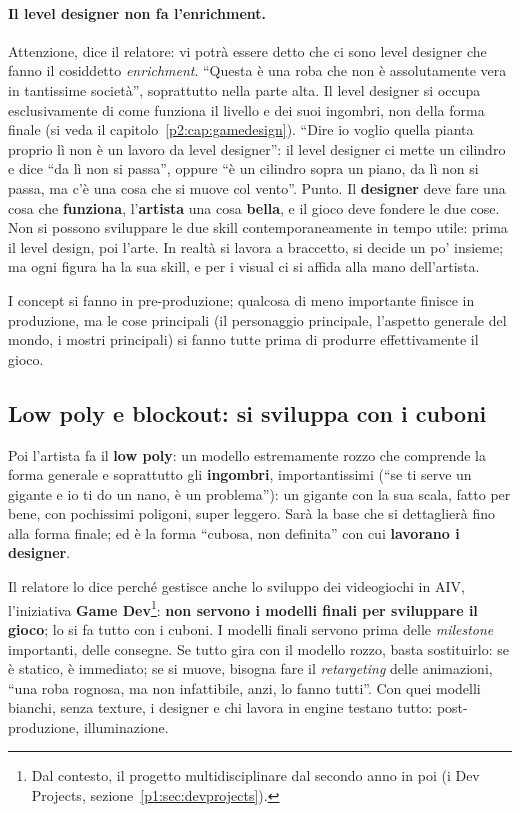 \paragraph{Il level designer non fa l'enrichment.} Attenzione, dice il
relatore: vi potrà essere detto che ci sono level designer che fanno il
cosiddetto \emph{enrichment}. ``Questa è una roba che non è assolutamente vera
in tantissime società'', soprattutto nella parte alta. Il level designer si
occupa esclusivamente di come funziona il livello e dei suoi ingombri, non della
forma finale (si veda il capitolo~\ref{p2:cap:gamedesign}). ``Dire io voglio
quella pianta proprio lì non è un lavoro da level designer'': il level designer
ci mette un cilindro e dice ``da lì non si passa'', oppure ``è un cilindro sopra
un piano, da lì non si passa, ma c'è una cosa che si muove col vento''. Punto.
Il \textbf{designer} deve fare una cosa che \textbf{funziona}, l'\textbf{artista}
una cosa \textbf{bella}, e il gioco deve fondere le due cose. Non si possono
sviluppare le due skill contemporaneamente in tempo utile: prima il level
design, poi l'arte. In realtà si lavora a braccetto, si decide un po' insieme;
ma ogni figura ha la sua skill, e per i visual ci si affida alla mano
dell'artista.

I concept si fanno in pre-produzione; qualcosa di meno importante finisce in
produzione, ma le cose principali (il personaggio principale, l'aspetto
generale del mondo, i mostri principali) si fanno tutte prima di produrre
effettivamente il gioco.

\subsection{Low poly e blockout: si sviluppa con i cuboni}

Poi l'artista fa il \textbf{low poly}: un modello estremamente rozzo che
comprende la forma generale e soprattutto gli \textbf{ingombri}, importantissimi
(``se ti serve un gigante e io ti do un nano, è un problema''): un gigante con
la sua scala, fatto per bene, con pochissimi poligoni, super leggero. Sarà la
base che si dettaglierà fino alla forma finale; ed è la forma ``cubosa, non
definita'' con cui \textbf{lavorano i designer}.

Il relatore lo dice perché gestisce anche lo sviluppo dei videogiochi in AIV,
l'iniziativa \textbf{Game Dev}\footnote{Dal contesto, il progetto
multidisciplinare dal secondo anno in poi (i Dev Projects,
sezione~\ref{p1:sec:devprojects}).}: \textbf{non servono i modelli finali per
sviluppare il gioco}; lo si fa tutto con i cuboni. I modelli finali servono
prima delle \emph{milestone} importanti, delle consegne. Se tutto gira con il
modello rozzo, basta sostituirlo: se è statico, è immediato; se si muove,
bisogna fare il \emph{retargeting} delle animazioni, ``una roba rognosa, ma non
infattibile, anzi, lo fanno tutti''. Con quei modelli bianchi, senza texture, i
designer e chi lavora in engine testano tutto: post-produzione, illuminazione.

